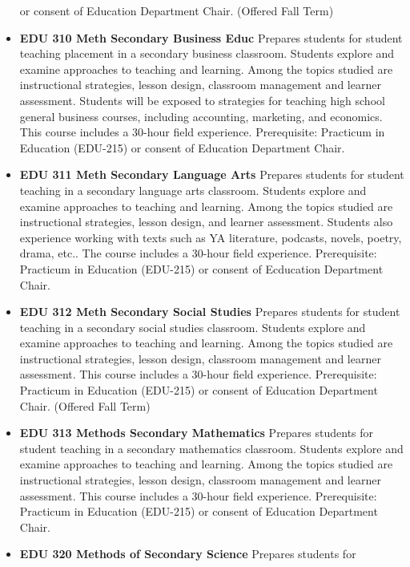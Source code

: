 \documentclass[
  letterpaper,
]{scrbook}
\begin{document}
\begin{itemize}
  or consent of Education Department Chair. (Offered Fall Term)\\
\item
  \textbf{EDU 310 Meth Secondary Business Educ} Prepares students for
  student teaching placement in a secondary business classroom. Students
  explore and examine approaches to teaching and learning. Among the
  topics studied are instructional strategies, lesson design, classroom
  management and learner assessment. Students will be exposed to
  strategies for teaching high school general business courses,
  including accounting, marketing, and economics. This course includes a
  30-hour field experience. Prerequisite: Practicum in Education
  (EDU-215) or consent of Education Department Chair.\\
\item
  \textbf{EDU 311 Meth Secondary Language Arts} Prepares students for
  student teaching in a secondary language arts classroom. Students
  explore and examine approaches to teaching and learning. Among the
  topics studied are instructional strategies, lesson design, and
  learner assessment. Students also experience working with texts such
  as YA literature, podcasts, novels, poetry, drama, etc.. The course
  includes a 30-hour field experience. Prerequisite: Practicum in
  Education (EDU-215) or consent of Ecducation Department Chair.\\
\item
  \textbf{EDU 312 Meth Secondary Social Studies} Prepares students for
  student teaching in a secondary social studies classroom. Students
  explore and examine approaches to teaching and learning. Among the
  topics studied are instructional strategies, lesson design, classroom
  management and learner assessment. This course includes a 30-hour
  field experience. Prerequisite: Practicum in Education (EDU-215) or
  consent of Education Department Chair. (Offered Fall Term)\\
\item
  \textbf{EDU 313 Methods Secondary Mathematics} Prepares students for
  student teaching in a secondary mathematics classroom. Students
  explore and examine approaches to teaching and learning. Among the
  topics studied are instructional strategies, lesson design, classroom
  management and learner assessment. This course includes a 30-hour
  field experience. Prerequisite: Practicum in Education (EDU-215) or
  consent of Education Department Chair.\\
\item
  \textbf{EDU 320 Methods of Secondary Science} Prepares students for

\end{itemize}
\end{document}

